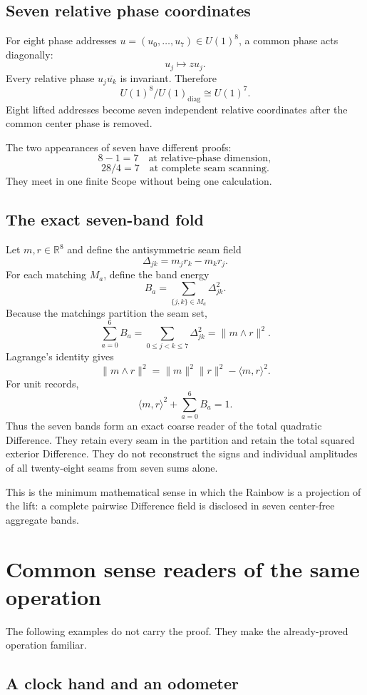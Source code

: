 \documentclass[11pt]{article}
\newcommand{\R}{\mathbb R}
\begin{document}
\subsection{Seven relative phase coordinates}

For eight phase addresses $u=(u_0,\ldots,u_7)\in U(1)^8$, a common phase acts diagonally:
\[
u_j\mapsto zu_j.
\]
Every relative phase $u_j\overline{u_k}$ is invariant. Therefore
\[
\boxed{U(1)^8/U(1)_{\mathrm{diag}}\cong U(1)^7.}
\]
Eight lifted addresses become seven independent relative coordinates after the common center phase is removed.

The two appearances of seven have different proofs:
\[
8-1=7
\quad\text{at relative-phase dimension},
\]
\[
28/4=7
\quad\text{at complete seam scanning}.
\]
They meet in one finite Scope without being one calculation.

\subsection{The exact seven-band fold}

Let $m,r\in\R^8$ and define the antisymmetric seam field
\[
\Delta_{jk}=m_jr_k-m_kr_j.
\]
For each matching $M_a$, define the band energy
\[
B_a=\sum_{\{j,k\}\in M_a}\Delta_{jk}^2.
\]
Because the matchings partition the seam set,
\[
\boxed{
\sum_{a=0}^6B_a
=
\sum_{0\le j<k\le7}\Delta_{jk}^2
=
\|m\wedge r\|^2.
}
\]
Lagrange's identity gives
\[
\|m\wedge r\|^2
=
\|m\|^2\|r\|^2-\langle m,r\rangle^2.
\]
For unit records,
\[
\boxed{
\langle m,r\rangle^2+\sum_{a=0}^6B_a=1.
}
\]
Thus the seven bands form an exact coarse reader of the total quadratic Difference. They retain every seam in the partition and retain the total squared exterior Difference. They do not reconstruct the signs and individual amplitudes of all twenty-eight seams from seven sums alone.

This is the minimum mathematical sense in which the Rainbow is a projection of the lift: a complete pairwise Difference field is disclosed in seven center-free aggregate bands.

\section{Common sense readers of the same operation}

The following examples do not carry the proof. They make the already-proved operation familiar.

\subsection{A clock hand and an odometer}
\end{document}
